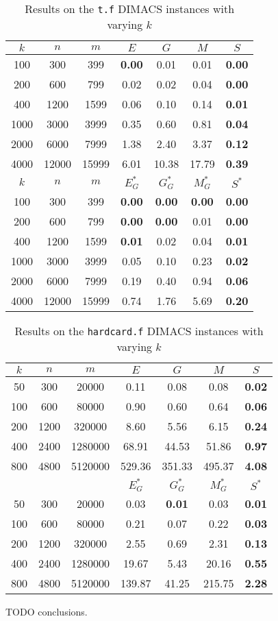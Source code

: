 \begin{table}
\centering
\begin{tabular}{
ccc|cccc}
$k$ & $n$ & $m$ & $E$ & $G$ & $M$ & $S$ \\
\hline
100 & 300 & 399 & \textbf{0.00} & 0.01 & 0.01 & \textbf{0.00} \\
200 & 600 & 799 & 0.02 & 0.02 & 0.04 & \textbf{0.00} \\
400 & 1200 & 1599 & 0.06 & 0.10 & 0.14 & \textbf{0.01} \\
1000 & 3000 & 3999 & 0.35 & 0.60 & 0.81 & \textbf{0.04} \\
2000 & 6000 & 7999 & 1.38 & 2.40 & 3.37 & \textbf{0.12} \\
4000 & 12000 & 15999 & 6.01 & 10.38 & 17.79 & \textbf{0.39} \\
\hline
$k$ & $n$ & $m$ & $E^*_G$ & $G^*_G$ & $M^*_G$ & $S^*$ \\
\hline
100 & 300 & 399 & \textbf{0.00} & \textbf{0.00} & \textbf{0.00} & \textbf{0.00} \\
200 & 600 & 799 & \textbf{0.00} & \textbf{0.00} & 0.01 & \textbf{0.00} \\
400 & 1200 & 1599 & \textbf{0.01} & 0.02 & 0.04 & \textbf{0.01} \\
1000 & 3000 & 3999 & 0.05 & 0.10 & 0.23 & \textbf{0.02} \\
2000 & 6000 & 7999 & 0.19 & 0.40 & 0.94 & \textbf{0.06} \\
4000 & 12000 & 15999 & 0.74 & 1.76 & 5.69 & \textbf{0.20} \\
\end{tabular}
\caption{Results on the \texttt{t.f} DIMACS instances with varying $k$}\label{tab:t}
\end{table}

\begin{table}
\centering
\begin{tabular}{
ccc|cccc}
$k$ & $n$ & $m$ & $E$ & $G$ & $M$ & $S$ \\
\hline
50 & 300 & 20000 & 0.11 & 0.08 & 0.08 & \textbf{0.02} \\
100 & 600 & 80000 & 0.90 & 0.60 & 0.64 & \textbf{0.06} \\
200 & 1200 & 320000 & 8.60 & 5.56 & 6.15 & \textbf{0.24} \\
400 & 2400 & 1280000 & 68.91 & 44.53 & 51.86 & \textbf{0.97} \\
800 & 4800 & 5120000 & 529.36 & 351.33 & 495.37 & \textbf{4.08} \\
\hline
& & & $E^*_G$ & $G^*_G$ & $M^*_G$ & $S^*$ \\
\hline
50 & 300 & 20000 & 0.03 & \textbf{0.01} & 0.03 & \textbf{0.01} \\
100 & 600 & 80000 & 0.21 & 0.07 & 0.22 & \textbf{0.03} \\
200 & 1200 & 320000 & 2.55 & 0.69 & 2.31 & \textbf{0.13} \\
400 & 2400 & 1280000 & 19.67 & 5.43 & 20.16 & \textbf{0.55} \\
800 & 4800 & 5120000 & 139.87 & 41.25 & 215.75 & \textbf{2.28} \\
\end{tabular}
\caption{Results on the \texttt{hardcard.f} DIMACS instances with varying $k$}\label{tab:hardcard}
\end{table}

TODO conclusions.